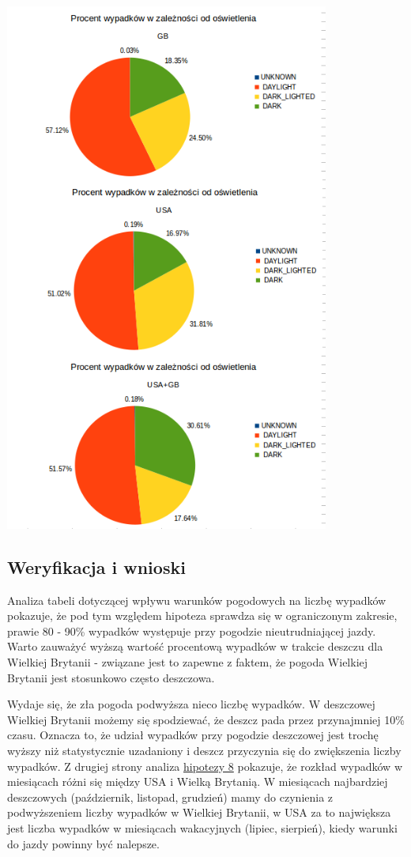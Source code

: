 \centerline{\includegraphics[width=0.8\textwidth]{images/hipotheses/lighting/lighting.png}}

\subsection{Weryfikacja i wnioski}\label{weryfikacja-i-wnioski}

Analiza tabeli dotyczącej wpływu warunków pogodowych na liczbę wypadków
pokazuje, że pod tym względem hipoteza sprawdza się w ograniczonym
zakresie, prawie 80 - 90\% wypadków występuje przy pogodzie
nieutrudniającej jazdy. Warto zauważyć wyższą wartość procentową
wypadków w trakcie deszczu dla Wielkiej Brytanii - związane jest to
zapewne z faktem, że pogoda Wielkiej Brytanii jest stosunkowo często
deszczowa.

Wydaje się, że zła pogoda podwyższa nieco liczbę wypadków. W deszczowej
Wielkiej Brytanii możemy się spodziewać, że deszcz pada przez
przynajmniej 10\% czasu. Oznacza to, że udział wypadków przy pogodzie
deszczowej jest trochę wyższy niż statystycznie uzadaniony i deszcz
przyczynia się do zwiększenia liczby wypadków. Z drugiej strony analiza
\href{Hipoteza-8}{hipotezy 8} pokazuje, że rozkład wypadków w miesiącach
różni się między USA i Wielką Brytanią. W miesiącach najbardziej
deszczowych (październik, listopad, grudzień) mamy do czynienia z
podwyższeniem liczby wypadków w Wielkiej Brytanii, w USA za to
największa jest liczba wypadków w miesiącach wakacyjnych (lipiec,
sierpień), kiedy warunki do jazdy powinny być nalepsze.

